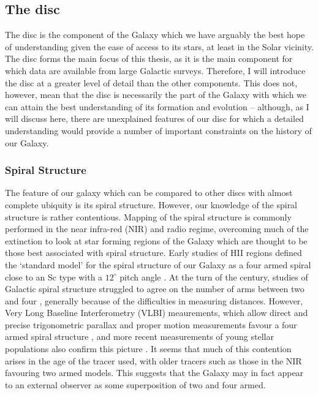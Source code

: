 \subsection{The disc}

The disc is the component of the Galaxy which we have arguably the best hope of understanding given the ease of access to its stars, at least in the Solar vicinity. The disc forms the main focus of this thesis, as it is the main component for which data are available from large Galactic surveys. Therefore, I will introduce the disc at a greater level of detail than the other components. This does not, however, mean that the disc is necessarily the part of the Galaxy with which we can attain the best understanding of its formation and evolution -- although, as I will discuss here, there are unexplained features of our disc for which a detailed understanding would provide a number of important constraints on the history of our Galaxy. 

\subsubsection{Spiral Structure}
The feature of our galaxy which can be compared to other discs with almost complete ubiquity is its spiral structure. However, our knowledge of the spiral structure is rather contentious. Mapping of the spiral structure is commonly performed in the near infra-red (NIR) and radio regime, overcoming much of the extinction to look at star forming regions of the Galaxy which are thought to be those best associated with spiral structure. Early studies of HII regions defined the `standard model' for the spiral structure of our Galaxy as a four armed spiral close to an Sc type with a $12^{\circ}$ pitch angle  \citep{1976A&A....49...57G}. At the turn of the century, studies of Galactic spiral structure struggled to agree on the number of arms between two and four \citep[e.g.][]{1976A&A....46..261S,1980ApJ...239L..53C,1981ApJ...250..551B,1995ApJ...454..119V,2000A&A...358L..13D,2003A&A...397..133R}, generally because of the difficulties in measuring distances. However, Very Long Baseline Interferometry (VLBI) meaurements, which allow direct and precise trigonometric parallax and proper motion measurements favour a four armed spiral structure \citep{2009ApJ...700..137R,2014ApJ...783..130R}, and more recent measurements of young stellar populations also confirm this picture \citep{2014MNRAS.437.1791U,2015MNRAS.450.4150C}. It seems that much of this contention arises in the age of the tracer used, with older tracers such as those in the NIR \citep[e.g.][]{2000A&A...358L..13D} favouring two armed models. This suggests that the Galaxy may in fact appear to an external observer as some superposition of two and four armed. 

